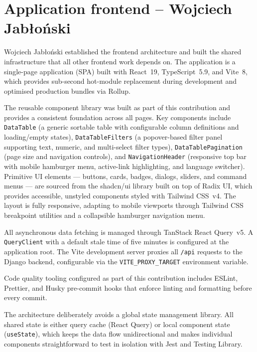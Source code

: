 \documentclass[11pt, a4paper]{article}
\begin{document}
\section{Application frontend  -- Wojciech Jabłoński}

Wojciech Jabłoński established the frontend architecture and built the shared infrastructure that all other frontend work depends on.
The application is a single-page application (SPA) built with React~19, TypeScript~5.9, and Vite~8, which provides sub-second hot-module replacement during development and optimised production bundles via Rollup.

The reusable component library was built as part of this contribution and provides a consistent foundation across all pages.
Key components include \texttt{DataTable} (a generic sortable table with configurable column definitions and loading/empty states), \texttt{DataTableFilters} (a popover-based filter panel supporting text, numeric, and multi-select filter types), \texttt{DataTablePagination} (page size and navigation controls), and \texttt{NavigationHeader} (responsive top bar with mobile hamburger menu, active-link highlighting, and language switcher).
Primitive UI elements — buttons, cards, badges, dialogs, sliders, and command menus — are sourced from the shadcn/ui library built on top of Radix UI, which provides accessible, unstyled components styled with Tailwind CSS~v4.
The layout is fully responsive, adapting to mobile viewports through Tailwind CSS breakpoint utilities and a collapsible hamburger navigation menu.

All asynchronous data fetching is managed through TanStack React Query~v5.
A \texttt{QueryClient} with a default stale time of five minutes is configured at the application root.
The Vite development server proxies all \texttt{/api} requests to the Django backend, configurable via the \texttt{VITE\_PROXY\_TARGET} environment variable.

Code quality tooling configured as part of this contribution includes ESLint, Prettier, and Husky pre-commit hooks that enforce linting and formatting before every commit.

The architecture deliberately avoids a global state management library.
All shared state is either query cache (React Query) or local component state (\texttt{useState}), which keeps the data flow unidirectional and makes individual components straightforward to test in isolation with Jest and Testing Library.
\end{document}
